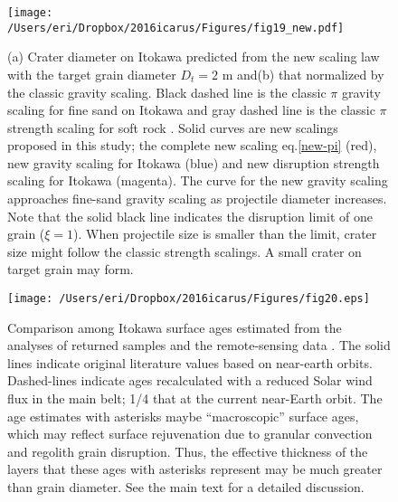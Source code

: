 \documentclass[3p,authoryear]{elsarticle}
\begin{document}
\begin{figure}[htbp]
	\begin{center}
	\texttt{[image: /Users/eri/Dropbox/2016icarus/Figures/fig19\_new.pdf]}
	\caption{(a) Crater diameter on Itokawa predicted from the new scaling law with the target grain diameter $D_t=2$ m and(b) that normalized by the classic gravity scaling. Black dashed line is the classic $\pi$ gravity scaling \citep[e.g.][]{holsapple1993} for fine sand on Itokawa and gray dashed line is the classic $\pi$ strength scaling for soft rock \citep{holsapple1993}. Solid curves are new scalings proposed in this study; the complete new scaling eq.\eqref{new-pi} (red), new gravity scaling for Itokawa (blue) and new disruption strength scaling for Itokawa (magenta). The curve for the new gravity scaling approaches fine-sand gravity scaling as projectile diameter increases. Note that the solid black line indicates the disruption limit of one grain ($\xi=1$). When projectile size is smaller than the limit, crater size might follow the classic strength scalings. A small crater on target grain may form. }
	\label{Itokawa-crater}
	\end{center}
\end{figure}

\begin{figure}[htbp]
	\centering
	\texttt{[image: /Users/eri/Dropbox/2016icarus/Figures/fig20.eps]}
	\caption{Comparison among Itokawa surface ages estimated from the analyses of returned samples and the remote-sensing data \citep{obrien2005, michel2009, nagao2011, basilevsky2014, koga2014, meier2014, noguchi2014, berger2015, bonal2015, nishiizumi2015, park2015}. The solid lines indicate original literature values based on near-earth orbits. Dashed-lines indicate ages recalculated with a reduced Solar wind flux in the main belt; 1/4 that at the current near-Earth orbit. The age estimates with asterisks maybe ``macroscopic'' surface ages, which may reflect surface rejuvenation due to granular convection and regolith grain disruption. Thus, the effective thickness of the layers that these ages with asterisks represent may be much greater than grain diameter. See the main text for a detailed discussion. }
	\label{itokawa-ages}
	\centering
\end{figure}



\end{document}
